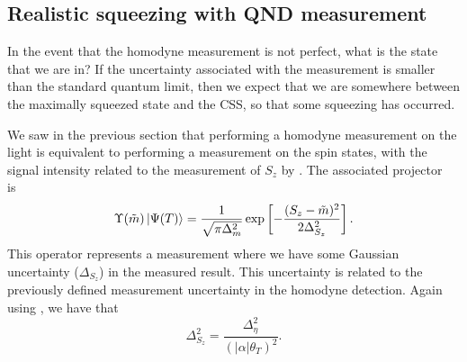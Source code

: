 \subsection{Realistic squeezing with QND measurement}

In the event that the homodyne measurement is not perfect, what is the state
that we are in? If the uncertainty associated with the measurement is smaller
than the standard quantum limit, then we expect that we are somewhere between
the maximally squeezed state and the CSS, so that some squeezing has
occurred.

We saw in the previous section that performing a homodyne measurement on the
light is equivalent to performing a measurement on the spin states, with the
signal intensity related to the measurement of $S_z$ by .
The associated projector is~\cite{MAURODARIANO2003205, Vanner16182, Cox2016}
%
\begin{equation}
  \Upsilon(\tilde{m})\ket{\Psi(T)} = \frac{1}{\sqrt{\pi\Delta_m^2}}\exp\left[
    -\frac{(S_z-\tilde{m})^2}{2\Delta_{S_z}^2}\right].
\end{equation}
%
This operator represents a measurement where we have some Gaussian uncertainty
($\Delta_{S_z}$) in the measured result. This uncertainty is related to the
previously defined measurement uncertainty in the homodyne detection. Again
using , we have that
%
\begin{equation}
  \Delta_{S_z}^2 = \frac{\Delta_\eta^2}{(|\alpha|\theta_T)^2}.
\end{equation}

